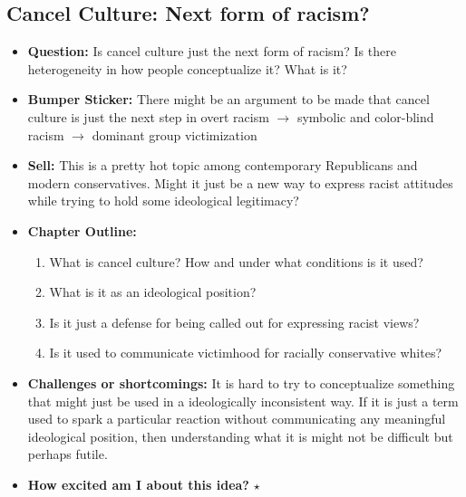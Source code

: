 \documentclass[12pt]{article}
\begin{document}
\subsection{Cancel Culture: Next form of racism?}
    \begin{itemize}
        \item \textbf{Question:} Is cancel culture just the next form of racism? Is there heterogeneity in how people conceptualize it? What is it?
        \item \textbf{Bumper Sticker:} There might be an argument to be made that cancel culture is just the next step in overt racism $\rightarrow$ symbolic and color-blind racism $\rightarrow$ dominant group victimization
        \item \textbf{Sell:} This is a pretty hot topic among contemporary Republicans and modern conservatives. Might it just be a new way to express racist attitudes while trying to hold some ideological legitimacy?
        \item \textbf{Chapter Outline:}
        \begin{enumerate}
            \item What is cancel culture? How and under what conditions is it used?
            \item What is it as an ideological position?
            \item Is it just a defense for being called out for expressing racist views?
            \item Is it used to communicate victimhood for racially conservative whites?
        \end{enumerate}
        \item \textbf{Challenges or shortcomings:} It is hard to try to conceptualize something that might just be used in a ideologically inconsistent way. If it is just a term used to spark a particular reaction without communicating any meaningful ideological position, then understanding what it is might not be difficult but perhaps futile.
        \item \textbf{How excited am I about this idea?} $\star$
    \end{itemize}
\end{document}
